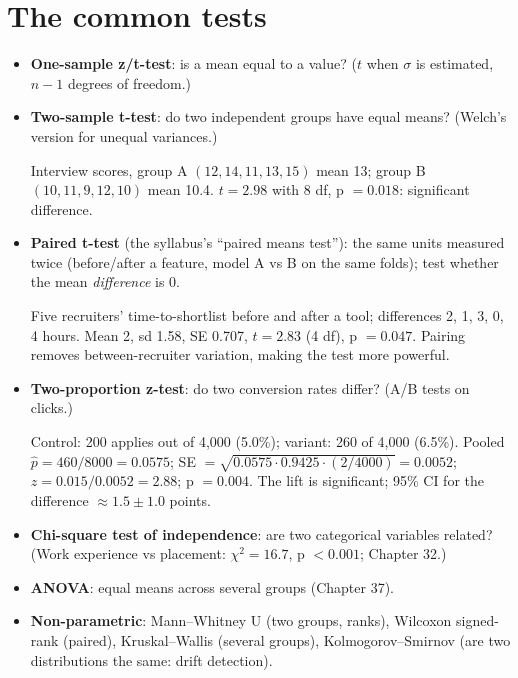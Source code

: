 \section{The common tests}
\begin{itemize}
\item \textbf{One-sample z/t-test}: is a mean equal to a value? ($t$ when $\sigma$ is estimated, $n - 1$ degrees of freedom.)
\item \textbf{Two-sample t-test}: do two independent groups have equal means? (Welch's version for unequal variances.)
  \begin{example}
  Interview scores, group A $(12, 14, 11, 13, 15)$ mean 13; group B $(10, 11, 9, 12, 10)$ mean 10.4. $t = 2.98$ with 8 df, p $= 0.018$: significant difference.
  \end{example}
\item \textbf{Paired t-test} (the syllabus's ``paired means test''): the same units measured twice (before/after a feature, model A vs B on the same folds); test whether the mean
  \emph{difference} is 0.
  \begin{example}[: paired t]
  Five recruiters' time-to-shortlist before and after a tool; differences 2, 1, 3, 0, 4 hours. Mean 2, sd 1.58, SE 0.707, $t = 2.83$ (4 df), p $= 0.047$. Pairing removes
  between-recruiter variation, making the test more powerful.
  \end{example}
\item \textbf{Two-proportion z-test}: do two conversion rates differ? (A/B tests on clicks.)
  \begin{example}[: an A/B test]
  Control: 200 applies out of 4{,}000 (5.0\%); variant: 260 of 4{,}000 (6.5\%). Pooled $\hat p = 460/8000 = 0.0575$; SE $= \sqrt{0.0575\cdot0.9425\cdot(2/4000)} = 0.0052$;
  $z = 0.015/0.0052 = 2.88$; p $= 0.004$. The lift is significant; 95\% CI for the difference $\approx 1.5\pm1.0$ points.
  \end{example}
\item \textbf{Chi-square test of independence}: are two categorical variables related? (Work experience vs placement: $\chi^2 = 16.7$, p $< 0.001$; Chapter 32.)
\item \textbf{ANOVA}: equal means across several groups (Chapter 37).
\item \textbf{Non-parametric}: Mann--Whitney U (two groups, ranks), Wilcoxon signed-rank (paired), Kruskal--Wallis (several groups), Kolmogorov--Smirnov (are two distributions
  the same: drift detection).
\end{itemize}

